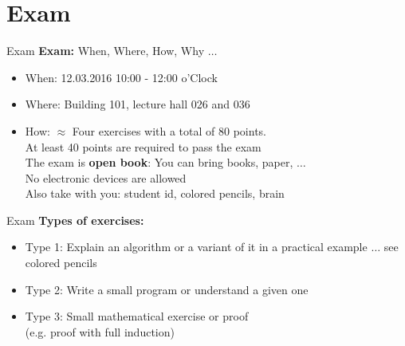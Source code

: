 \section{Exam}

\begin{frame}{Exam}
  \textbf{Exam:} When, Where, How, Why $\ldots$
  \vspace{1em}
  \begin{itemize}
    \item
      When: {\color{Mittel-Gruen}12.03.2016 10:00 - 12:00 o'Clock}
    \item
      Where: {\color{Mittel-Gruen}Building 101, lecture hall 026 and 036}
    \item
      How:
      $\approx$ Four exercises with a total of 80 points.\\
      At least 40 points are required to pass the exam\\
      The exam is \textbf{open book}: You can bring books, paper, $\ldots$\\
      No electronic devices are allowed\\
      Also take with you: {\color{Mittel-Gruen}student id},
      {\color{Mittel-Gruen}colored pencils}, {\color{Mittel-Gruen}brain}
  \end{itemize}
\end{frame}


\begin{frame}{Exam}
  \textbf{Types of exercises:}
  \begin{itemize}
    \item
      Type 1: Explain an algorithm or a variant of it in a practical example
      $\ldots$ see {\color{Mittel-Gruen}colored pencils}
    \item
      Type 2: Write a small program or understand a given one
    \item
      Type 3: Small mathematical exercise or proof\\
      (e.g. proof with full induction)
  \end{itemize}
\end{frame}
